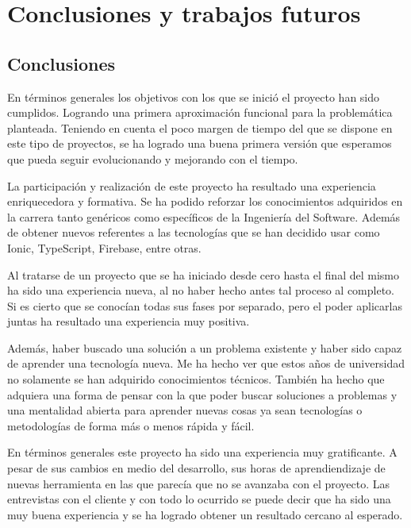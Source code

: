 \section{Conclusiones y trabajos futuros}
\subsection{Conclusiones}

En términos generales los objetivos con los que se inició el proyecto han
sido cumplidos. Logrando una primera aproximación funcional para
la problemática planteada. Teniendo en cuenta el poco margen de tiempo del
que se dispone en este tipo de proyectos, se ha logrado una buena primera
versión que esperamos que pueda seguir evolucionando y mejorando con el tiempo.

\medskip
La participación y realización de este proyecto ha resultado una
experiencia enriquecedora y formativa. Se ha podido reforzar los
conocimientos adquiridos en la carrera tanto genéricos como específicos
de la Ingeniería del Software. Además de obtener nuevos referentes a
las tecnologías que se han decidido usar como Ionic, TypeScript, Firebase,
entre otras.

\medskip
Al tratarse de un proyecto que se ha iniciado desde cero hasta el final
del mismo ha sido una experiencia nueva, al no haber hecho antes
tal proceso al completo. Si es cierto que se conocían todas sus
fases por separado, pero el poder aplicarlas juntas ha resultado
una experiencia muy positiva.

\medskip
Además, haber buscado una solución a un problema
existente y haber sido capaz de aprender una tecnología nueva.
Me ha hecho ver que estos años de universidad
no solamente se han adquirido conocimientos técnicos. También ha
hecho que adquiera una forma de pensar con la que poder buscar soluciones a
problemas y una mentalidad abierta para aprender nuevas cosas
ya sean tecnologías o metodologías de forma más o menos rápida y
fácil.

\medskip
En términos generales este proyecto ha sido una experiencia
muy gratificante. A pesar de sus cambios en medio del desarrollo,
sus horas de aprendiendizaje de nuevas herramienta en las que parecía que
no se avanzaba con el proyecto. Las entrevistas
con el cliente y con todo lo ocurrido se puede decir que ha sido
una muy buena experiencia y se ha logrado obtener un resultado cercano al
esperado.

